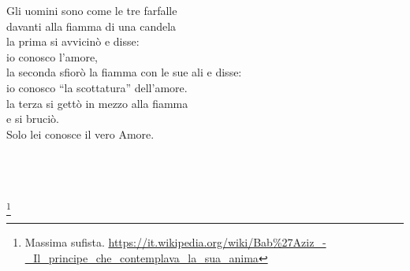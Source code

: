 \begin{vcentered}
    \begin{poem}
        Gli uomini sono come le tre farfalle\\
davanti alla fiamma di una candela\\
la prima si avvicinò e disse:\\
io conosco l'amore,\\
la seconda sfiorò la fiamma con le sue ali e disse:\\
io conosco ``la scottatura'' dell’amore.\\
la terza si gettò in mezzo alla fiamma\\
e si bruciò. \\
Solo lei conosce il vero Amore.\\
    \end{poem}
    \leavevmode\\
    \leavevmode\\
    \leavevmode\\
    \footnote{Massima sufista. \url{https://it.wikipedia.org/wiki/Bab\%27Aziz\_-\_Il\_principe\_che\_contemplava\_la\_sua\_anima}}
\end{vcentered}
